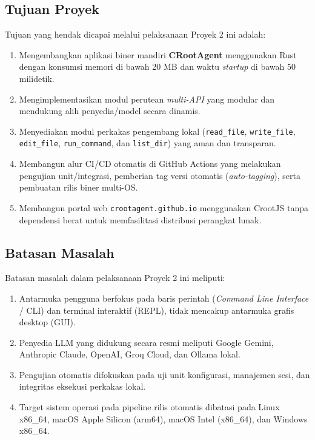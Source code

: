 \subsection{Tujuan Proyek}
Tujuan yang hendak dicapai melalui pelaksanaan Proyek 2 ini adalah:
\begin{enumerate}
    \item Mengembangkan aplikasi biner mandiri \textbf{CRootAgent} menggunakan Rust dengan konsumsi memori di bawah 20 MB dan waktu \textit{startup} di bawah 50 milidetik.
    \item Mengimplementasikan modul perutean \textit{multi-API} yang modular dan mendukung alih penyedia/model secara dinamis.
    \item Menyediakan modul perkakas pengembang lokal (\texttt{read\_file}, \texttt{write\_file}, \texttt{edit\_file}, \texttt{run\_command}, dan \texttt{list\_dir}) yang aman dan transparan.
    \item Membangun alur CI/CD otomatis di GitHub Actions yang melakukan pengujian unit/integrasi, pemberian tag versi otomatis (\textit{auto-tagging}), serta pembuatan rilis biner multi-OS.
    \item Membangun portal web \texttt{crootagent.github.io} menggunakan CrootJS tanpa dependensi berat untuk memfasilitasi distribusi perangkat lunak.
\end{enumerate}

\subsection{Batasan Masalah}
Batasan masalah dalam pelaksanaan Proyek 2 ini meliputi:
\begin{enumerate}
    \item Antarmuka pengguna berfokus pada baris perintah (\textit{Command Line Interface} / CLI) dan terminal interaktif (REPL), tidak mencakup antarmuka grafis desktop (GUI).
    \item Penyedia LLM yang didukung secara resmi meliputi Google Gemini, Anthropic Claude, OpenAI, Groq Cloud, dan Ollama lokal.
    \item Pengujian otomatis difokuskan pada uji unit konfigurasi, manajemen sesi, dan integritas eksekusi perkakas lokal.
    \item Target sistem operasi pada pipeline rilis otomatis dibatasi pada Linux x86\_64, macOS Apple Silicon (arm64), macOS Intel (x86\_64), dan Windows x86\_64.
\end{enumerate}

